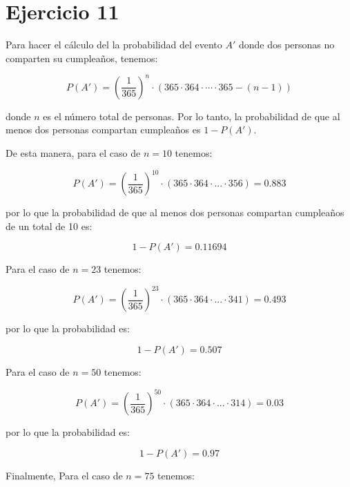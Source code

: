 \documentclass[letterpaper,12pt]{memoir}
\theoremstyle{definition}
\begin{document}
\section*{Ejercicio 11}

Para hacer el cálculo del la probabilidad del evento $A'$ donde dos personas no comparten su cumpleaños, tenemos:

\begin{equation}
  P(A') = (\frac{1}{365})^n \cdot (365 \cdot 364 \cdot \cdots \cdot 365-(n-1))
\end{equation}

donde $n$ es el número total de personas. Por lo tanto, la probabilidad de que al menos dos personas compartan cumpleaños es \(1-P(A')\).

De esta manera, para el caso de \(n = 10\) tenemos:

\begin{equation}
  P(A') = (\frac{1}{365})^{10} \cdot (365 \cdot 364 \cdot ... \cdot 356) = 0.883
\end{equation}

por lo que la probabilidad de que al menos dos personas compartan cumpleaños de un total de 10 es:

\begin{equation}
  1 - P(A') = 0.11694
\end{equation}

Para el caso de \(n = 23\) tenemos:

\begin{equation}
  P(A') = (\frac{1}{365})^{23} \cdot (365 \cdot 364 \cdot ... \cdot 341) = 0.493
\end{equation}

por lo que la probabilidad es:

\begin{equation}
  1 - P(A') = 0.507
\end{equation}

Para el caso de \(n = 50\) tenemos:

\begin{equation}
  P(A') = (\frac{1}{365})^{50} \cdot (365 \cdot 364 \cdot ... \cdot 314) = 0.03
\end{equation}

por lo que la probabilidad es:

\begin{equation}
  1 - P(A') = 0.97
\end{equation}

Finalmente, Para el caso de \(n = 75\) tenemos:
\end{document}
